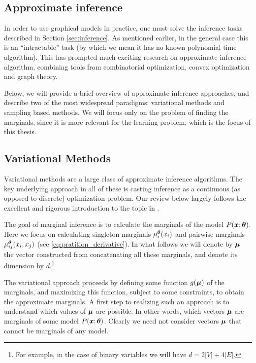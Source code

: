 \subsection{Approximate inference}
\label{sec:approx}
In order to use graphical models in practice, one must solve the inference tasks
described in Section \ref{sec:inference}. As mentioned earlier, in the general case
this is an ``intractable'' task (by which we mean it has no known polynomial time algorithm). This has prompted much exciting research on approximate inference algorithm, combining
tools from combinatorial optimization, convex optimization and graph theory. 

Below, we will provide a brief overview of approximate inference approaches, and describe two of the most widespread paradigms: variational methods and sampling based methods.  
We will focus only on the problem of finding the marginals, since it is more relevant for 
the learning problem, which is the focus of this thesis.

\subsection{Variational Methods}
\label{sec:variational_methods}
Variational methods are a large class of approximate inference algorithms. The key
underlying approach in all of these is casting inference as a continuous (as opposed to discrete) optimization problem. Our review below largely follows the excellent and rigorous introduction to the topic in \cite{wainwright2008graphical}. 

The goal of marginal inference is to calculate the marginals of the model $P(\boldsymbol{x};\boldsymbol{\theta})$. Here we focus on calculating singleton marginals $\mu_i^{\boldsymbol{\theta}}(x_i)$ and pairwise marginals  $\mu^{\boldsymbol{\theta}}_{ij}(x_i, x_j)$ (see \eqref{eq:pratition_derivative}). In what follows we will denote by $\boldsymbol{\mu}$ the vector constructed from concatenating all these marginals, and denote its dimension by $d$.\footnote{For example, in the case of binary variables we will have $d = 2|V| + 4|E|$.} 

The variational approach proceeds by defining some function $g(\boldsymbol{\mu})$ of the marginals, and maximizing this function, subject to some constraints, to obtain the approximate marginals. A first step to realizing such an approach is to understand which values of $\boldsymbol{\mu}$ are possible. In other words, which vectors $\boldsymbol{\mu}$ are marginals of some model $P(\boldsymbol{x};\boldsymbol{\theta})$. Clearly we need not consider vectors $\boldsymbol{\mu}$ that cannot be marginals of any model.

